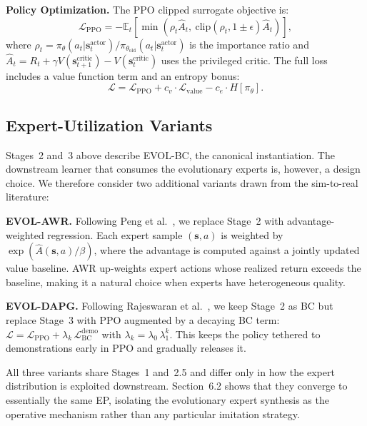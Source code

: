 \documentclass[sigconf,anonymous]{acmart}
\newcommand{\ours}{\textrm{EVOL}}
\newcommand{\bc}{\mathrm{BC}}
\newcommand{\ppo}{\mathrm{PPO}}
\newcommand{\E}{\mathbb{E}}
\begin{document}
\textbf{Policy Optimization.} The PPO clipped surrogate objective is:
\begin{equation}
    \mathcal{L}_{\ppo} = -\E_t\left[\min\left(\rho_t \hat{A}_t,\ \text{clip}(\rho_t, 1\pm\epsilon) \hat{A}_t\right)\right],
\end{equation}
where $\rho_t = \pi_\theta(a_t|\mathbf{s}_t^{\text{actor}}) / \pi_{\theta_{\text{old}}}(a_t|\mathbf{s}_t^{\text{actor}})$ is the importance ratio and $\hat{A}_t = R_t + \gamma V(\mathbf{s}_{t+1}^{\text{critic}}) - V(\mathbf{s}_t^{\text{critic}})$ uses the privileged critic. The full loss includes a value function term and an entropy bonus:
\begin{equation}
    \mathcal{L} = \mathcal{L}_{\ppo} + c_v \cdot \mathcal{L}_{\text{value}} - c_e \cdot H[\pi_\theta].
\end{equation}

\subsection{Expert-Utilization Variants}
\label{sec:variants}

Stages~2 and~3 above describe \ours{}-BC, the canonical instantiation. The downstream learner that consumes the evolutionary experts is, however, a design choice. We therefore consider two additional variants drawn from the sim-to-real literature:

\textbf{\ours{}-AWR.} Following Peng et al.~\cite{peng2019awr}, we replace Stage~2 with advantage-weighted regression. Each expert sample $(\mathbf{s},a)$ is weighted by $\exp(\hat{A}(\mathbf{s},a)/\beta)$, where the advantage is computed against a jointly updated value baseline. AWR up-weights expert actions whose realized return exceeds the baseline, making it a natural choice when experts have heterogeneous quality.

\textbf{\ours{}-DAPG.} Following Rajeswaran et al.~\cite{rajeswaran2018dexterous}, we keep Stage~2 as BC but replace Stage~3 with PPO augmented by a decaying BC term: $\mathcal{L} = \mathcal{L}_{\ppo} + \lambda_k\,\mathcal{L}_{\bc}^{\text{demo}}$ with $\lambda_k = \lambda_0\, \lambda_1^k$. This keeps the policy tethered to demonstrations early in PPO and gradually releases it.

All three variants share Stages~1 and~2.5 and differ only in how the expert distribution is exploited downstream. Section~6.2 shows that they converge to essentially the same EP, isolating the evolutionary expert synthesis as the operative mechanism rather than any particular imitation strategy.
\end{document}
